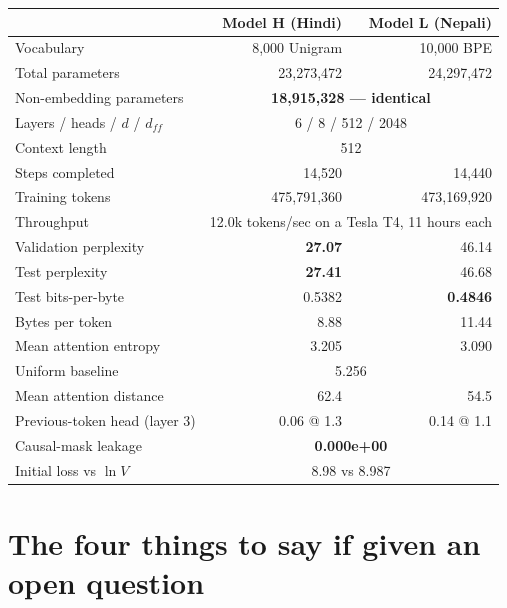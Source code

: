 \documentclass[11pt]{report}
\begin{document}
\begin{center}
\begin{tabular}{lrr}
\toprule
& \textbf{Model H (Hindi)} & \textbf{Model L (Nepali)} \\
\midrule
Vocabulary & 8,000 Unigram & 10,000 BPE \\
Total parameters & 23,273,472 & 24,297,472 \\
Non-embedding parameters & \multicolumn{2}{c}{\textbf{18,915,328 --- identical}} \\
Layers / heads / $d$ / $d_{ff}$ & \multicolumn{2}{c}{6 / 8 / 512 / 2048} \\
Context length & \multicolumn{2}{c}{512} \\
Steps completed & 14,520 & 14,440 \\
Training tokens & 475,791,360 & 473,169,920 \\
Throughput & \multicolumn{2}{c}{12.0k tokens/sec on a Tesla T4, 11 hours each} \\
\midrule
Validation perplexity & \textbf{27.07} & 46.14 \\
Test perplexity & \textbf{27.41} & 46.68 \\
Test bits-per-byte & 0.5382 & \textbf{0.4846} \\
Bytes per token & 8.88 & 11.44 \\
\midrule
Mean attention entropy & 3.205 & 3.090 \\
Uniform baseline & \multicolumn{2}{c}{5.256} \\
Mean attention distance & 62.4 & 54.5 \\
Previous-token head (layer 3) & 0.06 @ 1.3 & 0.14 @ 1.1 \\
\midrule
Causal-mask leakage & \multicolumn{2}{c}{\textbf{0.000e+00}} \\
Initial loss vs $\ln V$ & \multicolumn{2}{c}{8.98 vs 8.987} \\
\bottomrule
\end{tabular}
\end{center}

\section{The four things to say if given an open question}
\end{document}
